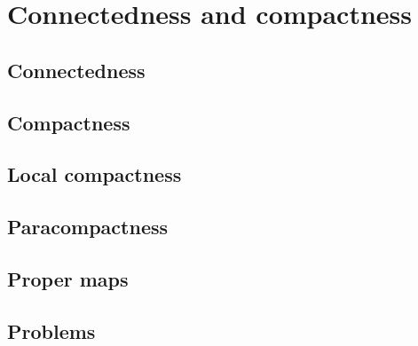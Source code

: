 \chapter{Connectedness and compactness}
\section{Connectedness}
\section{Compactness}
\section{Local compactness}
\section{Paracompactness}
\section{Proper maps}
\section{Problems}

